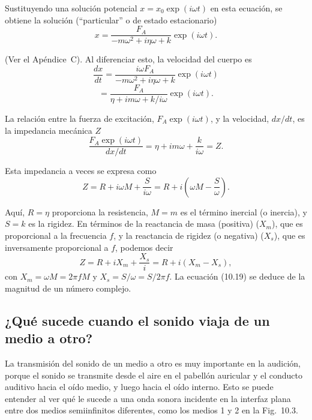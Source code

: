 \documentclass[12pt]{book}
\begin{document}
Sustituyendo una solución potencial $x = x_0 \exp(i\omega t)$ en esta ecuación, se obtiene la solución (``particular'' o de estado estacionario)
\begin{equation}
x = \frac{F_A}{-m\omega^2 + i\eta\omega + k} \exp(i\omega t).
\label{eq:10.22}
\end{equation}

(Ver el Apéndice~C). Al diferenciar esto, la velocidad del cuerpo es
\begin{equation}
\frac{dx}{dt} = \frac{i\omega F_A}{-m\omega^2 + i\eta\omega + k} \exp(i\omega t)
\label{eq:10.23}
\end{equation}
\begin{equation}
= \frac{F_A}{\eta + im\omega + k/i\omega} \exp(i\omega t).
\label{eq:10.24}
\end{equation}

La relación entre la fuerza de excitación, $F_A \exp(i\omega t)$, y la velocidad, $dx/dt$, es la impedancia mecánica $Z$
\begin{equation}
\frac{F_A \exp(i\omega t)}{dx/dt} = \eta + im\omega + \frac{k}{i\omega} = Z.
\label{eq:10.25}
\end{equation}

Esta impedancia a veces se expresa como
\begin{equation}
Z = R + i\omega M + \frac{S}{i\omega} = R + i\left(\omega M - \frac{S}{\omega}\right).
\label{eq:10.26}
\end{equation}

Aquí, $R = \eta$ proporciona la resistencia, $M = m$ es el término inercial (o inercia), y $S = k$ es la rigidez. En términos de la reactancia de masa (positiva) ($X_m$), que es proporcional a la frecuencia $f$, y la reactancia de rigidez (o negativa) ($X_s$), que es inversamente proporcional a $f$, podemos decir
\begin{equation}
Z = R + iX_m + \frac{X_s}{i} = R + i(X_m - X_s),
\label{eq:10.27}
\end{equation}
con $X_m = \omega M = 2\pi f M$ y $X_s = S/\omega = S/2\pi f$. La ecuación (10.19) se deduce de la magnitud de un número complejo.

\subsection{¿Qué sucede cuando el sonido viaja de un medio a otro?}

La transmisión del sonido de un medio a otro es muy importante en la audición, porque el sonido se transmite desde el aire en el pabellón auricular y el conducto auditivo hacia el oído medio, y luego hacia el oído interno. Esto se puede entender al ver qué le sucede a una onda sonora incidente en la interfaz plana entre dos medios semiinfinitos diferentes, como los medios 1 y 2 en la Fig.~10.3.
\end{document}
